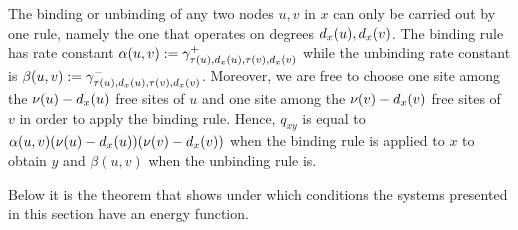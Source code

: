 The binding or unbinding of any two nodes $u,v$ in $x$
can only be carried out by one rule,
namely the one that operates on degrees $d_x(u),d_x(v)$.
The binding rule has rate constant
$\alpha(u,v) := \gamma^+_{\tau(u),d_x(u),\tau(v),d_x(v)}$
while the unbinding rate constant is
$\beta(u,v) := \gamma^-_{\tau(u),d_x(u),\tau(v),d_x(v)}$.
Moreover, we are free to choose
one site among the $\nu(u)-d_x(u)$ free sites of $u$
and one site among the $\nu(v)-d_x(v)$ free sites of $v$
in order to apply the binding rule.
Hence, $q_{xy}$ is equal to $\alpha(u,v)
(\nu(u) - d_x(u)) (\nu(v) - d_x(v))$
when the binding rule is applied to $x$ to obtain $y$
and $\beta(u,v)$
when the unbinding rule is.

Below it is the theorem that shows under which conditions
the systems presented in this section have an energy function.

